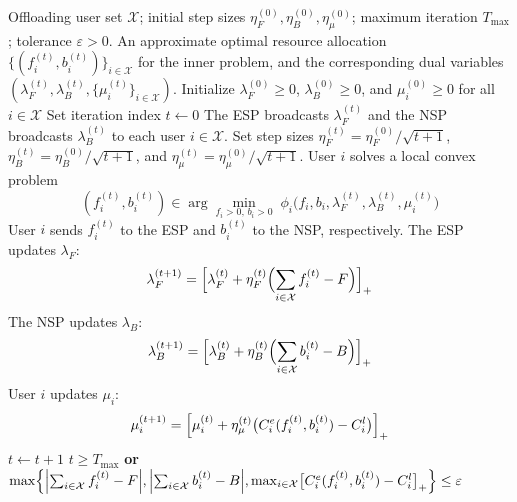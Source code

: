 \documentclass[lettersize,journal]{IEEEtran}
\begin{document}
\begin{algorithm}[t]
\caption{Distributed Primal--Dual Algorithm for the Inner Problem}
\label{alg:distributed-inner}
\begin{algorithmic}[1]
\REQUIRE Offloading user set $\mathcal{X}$; initial step sizes $\eta_F^{(0)},\eta_B^{(0)},\eta_\mu^{(0)}$; maximum iteration $T_{\max}$; tolerance $\varepsilon>0$.
\ENSURE An approximate optimal resource allocation $\{(f_i^{(t)},b_i^{(t)})\}_{i\in\mathcal{X}}$ for the inner problem, and the corresponding dual variables $(\lambda_F^{(t)},\lambda_B^{(t)},\{\mu_i^{(t)}\}_{i\in\mathcal{X}})$.
\STATE Initialize $\lambda_F^{(0)} \ge 0$, $\lambda_B^{(0)} \ge 0$, and $\mu_i^{(0)} \ge 0$ for all $i\in\mathcal{X}$
\STATE Set iteration index $t \gets 0$
\REPEAT
    \STATE The ESP broadcasts $\lambda_F^{(t)}$ and the NSP broadcasts $\lambda_B^{(t)}$ to each user $i\in\mathcal{X}$.
    \STATE Set step sizes $\eta_F^{(t)}=\eta_F^{(0)}/\sqrt{t+1}$, $\eta_B^{(t)}=\eta_B^{(0)}/\sqrt{t+1}$, and $\eta_\mu^{(t)}=\eta_\mu^{(0)}/\sqrt{t+1}$.
    \STATE User $i$ solves a local convex problem
    \[
        (f_i^{(t)},b_i^{(t)}) \in \arg\min_{f_i>0,\,b_i>0} \;
        \phi_i\big(f_i,b_i,\lambda_F^{(t)},\lambda_B^{(t)},\mu_i^{(t)}\big)
    \]
    \STATE User $i$ sends $f_i^{(t)}$ to the ESP and $b_i^{(t)}$ to the NSP, respectively.
    \ENDFOR
    \STATE The ESP updates $\lambda_F$:
    \[
    \lambda_F^{(t+1)}=\Bigl[\lambda_F^{(t)}+\eta_F^{(t)}\Bigl(\sum_{i\in\mathcal{X}} f_i^{(t)}-F\Bigr)\Bigr]_+
    \]
    \STATE The NSP updates $\lambda_B$:
    \[
    \lambda_B^{(t+1)}=\Bigl[\lambda_B^{(t)}+\eta_B^{(t)}\Bigl(\sum_{i\in\mathcal{X}} b_i^{(t)}-B\Bigr)\Bigr]_+
    \]
    \STATE User $i$ updates $\mu_i$:
    \[
    \mu_i^{(t+1)}=\Bigl[\mu_i^{(t)}+\eta_\mu^{(t)}\bigl(C_i^e(f_i^{(t)},b_i^{(t)})-C_i^l\bigr)\Bigr]_+
    \]
    \ENDFOR
    \STATE $t \gets t+1$
\UNTIL $t\ge T_{\max}$ \textbf{or}
$\max\Bigl\{\Bigl|\sum_{i\in\mathcal{X}} f_i^{(t)}-F\Bigr|,
\Bigl|\sum_{i\in\mathcal{X}} b_i^{(t)}-B\Bigr|,
\max_{i\in\mathcal{X}}\bigl[C_i^e(f_i^{(t)},b_i^{(t)})-C_i^l\bigr]_+\Bigr\}\le \varepsilon$
\end{algorithmic}
\end{algorithm}
\end{document}
